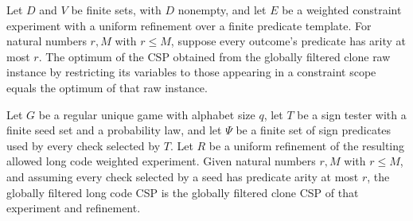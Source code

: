 \begin{theorem}
\label{FABL.WeightedConstraintExperiment.UniformRefinement.globallyFilteredCloneCSP_optimum}
\leanok
{}
Let $D$ and $V$ be finite sets, with $D$ nonempty, and let $E$ be a weighted constraint
experiment with a uniform refinement over a finite predicate template. For natural
numbers $r,M$ with $r\le M$, suppose every outcome's predicate has arity at most $r$.
The optimum of the CSP obtained from the globally filtered clone raw instance by
restricting its variables to those appearing in a constraint scope equals the optimum of
that raw instance.
\end{theorem}

\begin{definition}
\label{FABL.RegularUniqueGame.globallyFilteredLongCodeCSP}
\leanok
{}
Let $G$ be a regular unique game with alphabet size $q$, let $T$ be a sign tester with a
finite seed set and a probability law, and let $\Psi$ be a finite set of sign predicates
used by every check selected by $T$. Let $R$ be a uniform refinement of the resulting
allowed long code weighted experiment. Given natural numbers $r,M$ with $r\le M$, and
assuming every check selected by a seed has predicate arity at most $r$, the globally
filtered long code CSP is the globally filtered clone CSP of that experiment and
refinement.
\end{definition}

